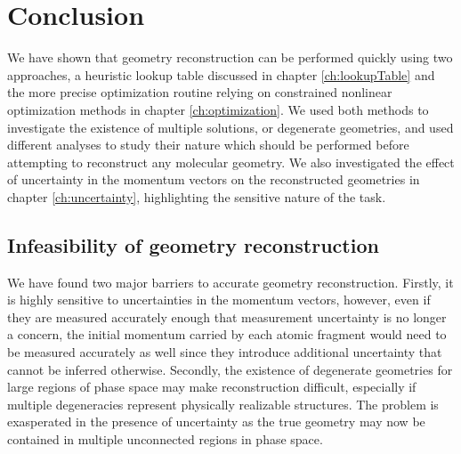 \chapter{Conclusion}\label{ch:conclusion}


We have shown that geometry reconstruction can be performed quickly using two approaches, a heuristic lookup table discussed in chapter \ref{ch:lookupTable} and the more precise optimization routine relying on constrained nonlinear optimization methods in chapter \ref{ch:optimization}. We used both methods to investigate the existence of multiple solutions, or degenerate geometries, and used different analyses to study their nature which should be performed before attempting to reconstruct any molecular geometry. We also investigated the effect of uncertainty in the momentum vectors on the reconstructed geometries in chapter \ref{ch:uncertainty}, highlighting the sensitive nature of the task.

\section{Infeasibility of geometry reconstruction}
We have found two major barriers to accurate geometry reconstruction. Firstly, it is highly sensitive to uncertainties in the momentum vectors, however, even if they are measured accurately enough that measurement uncertainty is no longer a concern, the initial momentum carried by each atomic fragment would need to be measured accurately as well since they introduce additional uncertainty that cannot be inferred otherwise. Secondly, the existence of degenerate geometries for large regions of phase space may make reconstruction difficult, especially if multiple degeneracies represent physically realizable structures. The problem is exasperated in the presence of uncertainty as the true geometry may now be contained in multiple unconnected regions in phase space.

